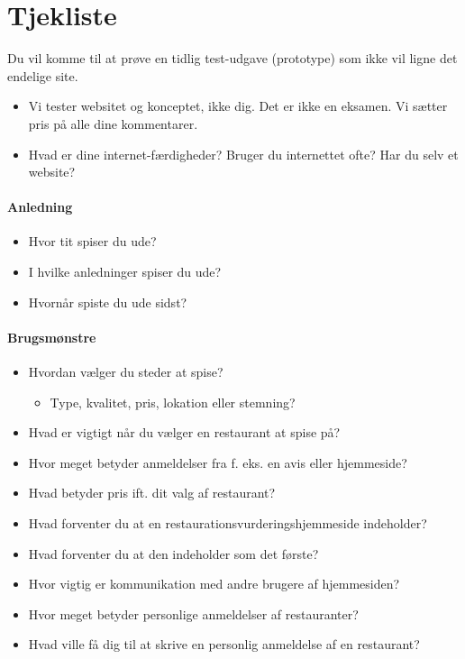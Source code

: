 \documentclass[a4paper, 12pt]{article}
\begin{document}

\newpage
\setcounter{page}{1}
\fancyfoot[C]{\thepage}

\section*{Tjekliste}

Du vil komme til at prøve en tidlig test-udgave (prototype) som ikke vil ligne det endelige site.
\begin{itemize}
\item Vi tester websitet og konceptet, ikke dig. Det er ikke en
  eksamen. Vi sætter pris på alle dine kommentarer.
\item Hvad er dine internet-færdigheder? Bruger du internettet ofte?
  Har du selv et website?
\end{itemize}

\paragraph{Anledning}
\begin{itemize}
\item Hvor tit spiser du ude?
\item I hvilke anledninger spiser du ude?
\item Hvornår spiste du ude sidst?
\end{itemize}

\paragraph{Brugsmønstre}
\begin{itemize}
\item Hvordan vælger du steder at spise?
  \begin{itemize}
  \item Type, kvalitet, pris, lokation eller stemning?
  \end{itemize}
\item Hvad er vigtigt når du vælger en restaurant at spise på?
\item Hvor meget betyder anmeldelser fra f. eks. en avis eller hjemmeside?
\item Hvad betyder pris ift. dit valg af restaurant?
\item Hvad forventer du at en restaurationsvurderingshjemmeside indeholder?
\item Hvad forventer du at den indeholder som det første?
\item Hvor vigtig er kommunikation med andre brugere af hjemmesiden?
\item Hvor meget betyder personlige anmeldelser af restauranter?
\item Hvad ville få dig til at skrive en personlig anmeldelse af en restaurant?
\end{itemize}
\end{document}
